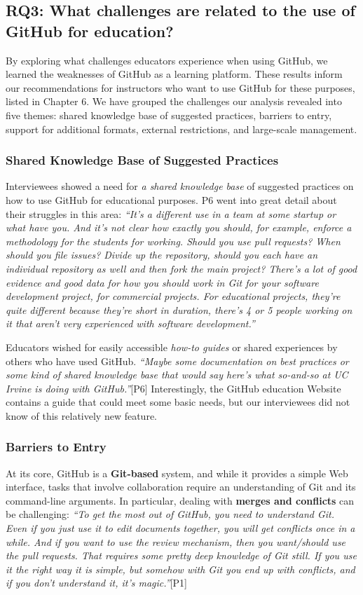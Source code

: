 \subsection{RQ3: What challenges are related to the use of GitHub for education?}
By exploring what challenges educators experience when using GitHub, we learned the weaknesses of GitHub as a learning platform. These results inform our recommendations for instructors who want to use GitHub for these purposes, listed in Chapter 6. We have grouped the challenges our analysis revealed into five themes: shared knowledge base of suggested practices, barriers to entry, support for additional formats, external restrictions, and large-scale management.

\subsubsection{Shared Knowledge Base of Suggested Practices}
Interviewees showed a need for \textit{a shared knowledge base} of suggested practices on how to use GitHub for educational purposes. P6 went into great detail about their struggles in this area: \textit{``It's a different use in a team at some startup or what have you. And it's not clear how exactly you should, for example, enforce a methodology for the students for working. Should you use pull requests? When should you file issues? Divide up the repository, should you each have an individual repository as well and then fork the main project? There's a lot of good evidence and good data for how you should work in Git for your software development project, for commercial projects. For educational projects, they're quite different because they're short in duration, there's 4 or 5 people working on it that aren't very experienced with software development.''}

Educators wished for easily accessible \textit{how-to guides} or shared experiences by others who have used GitHub. \textit{``Maybe some documentation on best practices or some kind of shared knowledge base that would say here's what so-and-so at UC Irvine is doing with GitHub.''}[P6]
Interestingly, the GitHub education Website contains a guide that could meet some basic needs, but our interviewees did not know of this relatively new feature.


\subsubsection{Barriers to Entry}
At its core, GitHub is a \textbf{Git-based} system, and while it provides a simple Web interface, tasks that involve collaboration require an understanding of Git and its command-line arguments. In particular, dealing with \textbf{merges and conflicts} can be challenging: \textit{``To get the most out of GitHub, you need to understand Git. Even if you just use it to edit documents together, you will get conflicts once in a while. And if you want to use the review mechanism, then you want/should use the pull requests. That requires some pretty deep knowledge of Git still. If you use it the right way it is simple, but somehow with Git you end up with conflicts, and if you don't understand it, it's magic.''}[P1]


